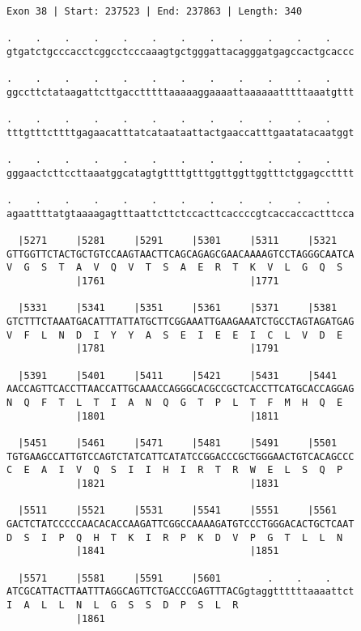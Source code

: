 \documentclass{article}
\begin{document}
\begin{Verbatim}
Exon 38 | Start: 237523 | End: 237863 | Length: 340
 
.    .    .    .    .    .    .    .    .    .    .    .    
gtgatctgcccacctcggcctcccaaagtgctgggattacagggatgagccactgcaccc
  
.    .    .    .    .    .    .    .    .    .    .    .    
ggccttctataagattcttgacctttttaaaaaggaaaattaaaaaatttttaaatgttt
  
.    .    .    .    .    .    .    .    .    .    .    .    
tttgtttcttttgagaacatttatcataataattactgaaccatttgaatatacaatggt
  
.    .    .    .    .    .    .    .    .    .    .    .    
gggaactcttccttaaatggcatagtgttttgtttggttggttggtttctggagcctttt
  
.    .    .    .    .    .    .    .    .    .    .    .    
agaattttatgtaaaagagtttaattcttctccacttcaccccgtcaccaccactttcca
  
  |5271     |5281     |5291     |5301     |5311     |5321   
GTTGGTTCTACTGCTGTCCAAGTAACTTCAGCAGAGCGAACAAAAGTCCTAGGGCAATCA
V  G  S  T  A  V  Q  V  T  S  A  E  R  T  K  V  L  G  Q  S  
            |1761                         |1771             
  
  |5331     |5341     |5351     |5361     |5371     |5381   
GTCTTTCTAAATGACATTTATTATGCTTCGGAAATTGAAGAAATCTGCCTAGTAGATGAG
V  F  L  N  D  I  Y  Y  A  S  E  I  E  E  I  C  L  V  D  E  
            |1781                         |1791             
  
  |5391     |5401     |5411     |5421     |5431     |5441   
AACCAGTTCACCTTAACCATTGCAAACCAGGGCACGCCGCTCACCTTCATGCACCAGGAG
N  Q  F  T  L  T  I  A  N  Q  G  T  P  L  T  F  M  H  Q  E  
            |1801                         |1811             
  
  |5451     |5461     |5471     |5481     |5491     |5501   
TGTGAAGCCATTGTCCAGTCTATCATTCATATCCGGACCCGCTGGGAACTGTCACAGCCC
C  E  A  I  V  Q  S  I  I  H  I  R  T  R  W  E  L  S  Q  P  
            |1821                         |1831             
  
  |5511     |5521     |5531     |5541     |5551     |5561   
GACTCTATCCCCCAACACACCAAGATTCGGCCAAAAGATGTCCCTGGGACACTGCTCAAT
D  S  I  P  Q  H  T  K  I  R  P  K  D  V  P  G  T  L  L  N  
            |1841                         |1851             
  
  |5571     |5581     |5591     |5601        .    .    .    
ATCGCATTACTTAATTTAGGCAGTTCTGACCCGAGTTTACGgtaggttttttaaaattct
I  A  L  L  N  L  G  S  S  D  P  S  L  R                    
            |1861                                           
  

\end{Verbatim}
\end{document}
